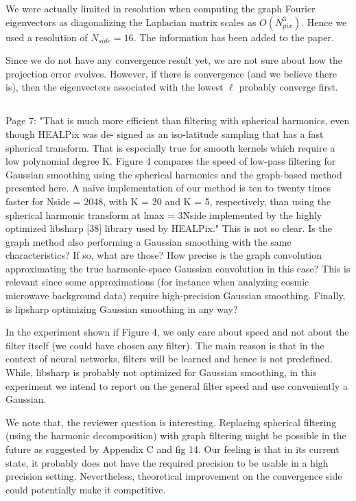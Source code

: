 \documentclass[12pt,a4paper]{article}
\newcommand{\todo}[1]{{\color[rgb]{.6,.1,.6}{TODO: #1}}}
\newcommand{\1}{\b{1}}              %
\newcommand{\0}{\b{0}}              %
\begin{document}
\todo{Assigned: @nati}
We were actually limited in resolution when computing the graph Fourier eigenvectors as diagonalizing the Laplacian matrix scales as $O(N_{pix}^3)$. Hence we used a resolution of $N_{side}=16$. The information has been added to the paper. 

Since we do not have any convergence result yet, we are not sure about how the projection error evolves. However, if there is convergence (and we believe there is), then the eigenvectors associated with the lowest $\ell$ probably converge first.

\subsection{}
\begin{mdframed}[style=comment] 
Page 7: "That is much more efficient than filtering with spherical harmonics, even though HEALPix was de- signed as an iso-latitude sampling that has a fast spherical transform. That is especially true for smooth kernels which require a low polynomial degree K. Figure 4 compares the speed of low-pass filtering for Gaussian smoothing using the spherical harmonics and the graph-based method presented here. A naive implementation of our method is ten to twenty times faster for Nside = 2048, with K = 20 and K = 5, respectively, than using the spherical harmonic transform at lmax = 3Nside implemented by the highly optimized libsharp [38] library used by HEALPix." This is not so clear. Is the graph method also performing a Gaussian smoothing with the same characteristics? If so, what are those? How precise is the graph convolution approximating the true harmonic-space Gaussian convolution in this case? This is relevant since some approximations (for instance when analyzing cosmic microwave background data) require high-precision Gaussian smoothing. Finally, is lipsharp optimizing Gaussian smoothing in any way?
\end{mdframed}
\todo{Assigned: @nati,
Tocheck: @tomek, @michael
}

In the experiment shown if Figure 4, we only care about speed and not about the filter itself (we could have chosen any filter). The main reason is that in the context of neural networks, filters will be learned and hence is not predefined. 
While, libsharp is probably not optimized for Gaussian smoothing, in this experiment we intend to report on the general filter speed and use conveniently a Gaussian.

We note that, the reviewer question is interesting. Replacing spherical filtering (using the harmonic decomposition) with graph filtering might be possible in the future as suggested by Appendix C and fig 14.
Our feeling is that in its current state, it probably does not have the required precision to be usable in a high precision setting. Nevertheless, theoretical improvement on the convergence side could potentially make it competitive.
\end{document}
